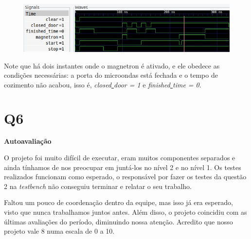 \documentclass[12pt]{article}
\begin{document}
\begin{figure}[!htb]
    \centering
    \includegraphics[scale=0.7]{imgs/testecontrol2}\\
    \label{fig:teste2}
\end{figure}

Note que há dois instantes onde o magnetron é ativado, e ele obedece as condições necessárias: a porta do microondas está fechada e o tempo de cozimento não acabou, isso é, \textit{closed\underline{ }door = 1} e \textit{finished\underline{ }time = 0}.


\pagebreak
\section*{Q6}
\begin{center}
\textbf{Autoavaliação}
\end{center}

O projeto foi muito difícil de executar, eram muitos componentes separados e ainda tínhamos de nos preocupar em juntá-los no nível 2 e no nível 1. Os testes realizados funcionam como esperado, o responsável por fazer os testes da questão 2 na \textit{testbench} não conseguiu terminar e relatar o seu trabalho.

Faltou um pouco de coordenação dentro da equipe, mas isso já era esperado, visto que nunca trabalhamos juntos antes. Além disso, o projeto coincidiu com as últimas avaliações do período, diminuindo nossa atenção.
Acredito que nosso projeto vale 8 numa escala de 0 a 10.
\end{document}
